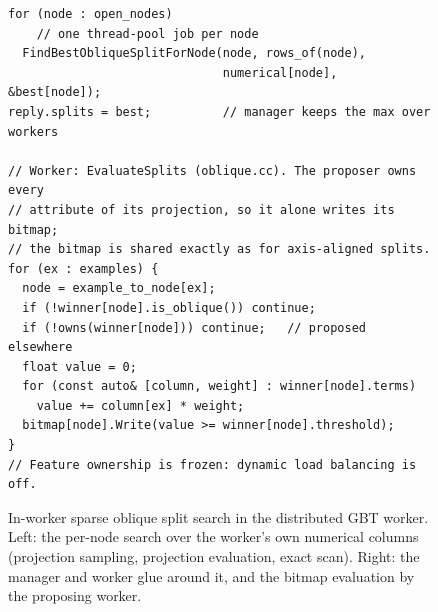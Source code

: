 \begin{figure}[t]
\begin{minipage}[t]{0.46\textwidth}
\begin{lstlisting}
for (node : open_nodes)
    // one thread-pool job per node
  FindBestObliqueSplitForNode(node, rows_of(node),
                              numerical[node], &best[node]);
reply.splits = best;          // manager keeps the max over workers

// Worker: EvaluateSplits (oblique.cc). The proposer owns every
// attribute of its projection, so it alone writes its bitmap;
// the bitmap is shared exactly as for axis-aligned splits.
for (ex : examples) {
  node = example_to_node[ex];
  if (!winner[node].is_oblique()) continue;
  if (!owns(winner[node])) continue;   // proposed elsewhere
  float value = 0;
  for (const auto& [column, weight] : winner[node].terms)
    value += column[ex] * weight;
  bitmap[node].Write(value >= winner[node].threshold);
}
// Feature ownership is frozen: dynamic load balancing is off.
\end{lstlisting}
\end{minipage}
\caption{In-worker sparse oblique split search in the distributed GBT worker. Left: the per-node search over the worker's own numerical columns (projection sampling, projection evaluation, exact scan). Right: the manager and worker glue around it, and the bitmap evaluation by the proposing worker.}
\label{lst:in_worker_oblique}
\end{figure}
